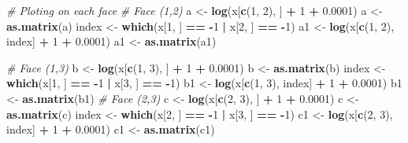 \documentclass[
]{article}
\newenvironment{Shaded}{\begin{snugshade}}{\end{snugshade}}
\newcommand{\CommentTok}[1]{\textcolor[rgb]{0.56,0.35,0.01}{\textit{#1}}}
\newcommand{\DecValTok}[1]{\textcolor[rgb]{0.00,0.00,0.81}{#1}}
\newcommand{\FloatTok}[1]{\textcolor[rgb]{0.00,0.00,0.81}{#1}}
\newcommand{\FunctionTok}[1]{\textcolor[rgb]{0.13,0.29,0.53}{\textbf{#1}}}
\newcommand{\NormalTok}[1]{#1}
\newcommand{\OtherTok}[1]{\textcolor[rgb]{0.56,0.35,0.01}{#1}}
\newcommand{\SpecialCharTok}[1]{\textcolor[rgb]{0.81,0.36,0.00}{\textbf{#1}}}
\begin{document}
\begin{Shaded}
\begin{Highlighting}[]
\CommentTok{\# Ploting on each face}
\CommentTok{\# Face (1,2)}
\NormalTok{a }\OtherTok{\textless{}{-}} \FunctionTok{log}\NormalTok{(x[}\FunctionTok{c}\NormalTok{(}\DecValTok{1}\NormalTok{, }\DecValTok{2}\NormalTok{), ] }\SpecialCharTok{+} \DecValTok{1} \SpecialCharTok{+} \FloatTok{0.0001}\NormalTok{)}
\NormalTok{a }\OtherTok{\textless{}{-}} \FunctionTok{as.matrix}\NormalTok{(a)}
\NormalTok{index }\OtherTok{\textless{}{-}} \FunctionTok{which}\NormalTok{(x[}\DecValTok{1}\NormalTok{, ] }\SpecialCharTok{==} \SpecialCharTok{{-}}\DecValTok{1} \SpecialCharTok{|}\NormalTok{ x[}\DecValTok{2}\NormalTok{, ] }\SpecialCharTok{==} \SpecialCharTok{{-}}\DecValTok{1}\NormalTok{)}
\NormalTok{a1 }\OtherTok{\textless{}{-}} \FunctionTok{log}\NormalTok{(x[}\FunctionTok{c}\NormalTok{(}\DecValTok{1}\NormalTok{, }\DecValTok{2}\NormalTok{), index] }\SpecialCharTok{+} \DecValTok{1} \SpecialCharTok{+} \FloatTok{0.0001}\NormalTok{)}
\NormalTok{a1 }\OtherTok{\textless{}{-}} \FunctionTok{as.matrix}\NormalTok{(a1)}

\CommentTok{\# Face (1,3)}
\NormalTok{b }\OtherTok{\textless{}{-}} \FunctionTok{log}\NormalTok{(x[}\FunctionTok{c}\NormalTok{(}\DecValTok{1}\NormalTok{, }\DecValTok{3}\NormalTok{), ] }\SpecialCharTok{+} \DecValTok{1} \SpecialCharTok{+} \FloatTok{0.0001}\NormalTok{)}
\NormalTok{b }\OtherTok{\textless{}{-}} \FunctionTok{as.matrix}\NormalTok{(b)}
\NormalTok{index }\OtherTok{\textless{}{-}} \FunctionTok{which}\NormalTok{(x[}\DecValTok{1}\NormalTok{, ] }\SpecialCharTok{==} \SpecialCharTok{{-}}\DecValTok{1} \SpecialCharTok{|}\NormalTok{ x[}\DecValTok{3}\NormalTok{, ] }\SpecialCharTok{==} \SpecialCharTok{{-}}\DecValTok{1}\NormalTok{)}
\NormalTok{b1 }\OtherTok{\textless{}{-}} \FunctionTok{log}\NormalTok{(x[}\FunctionTok{c}\NormalTok{(}\DecValTok{1}\NormalTok{, }\DecValTok{3}\NormalTok{), index] }\SpecialCharTok{+} \DecValTok{1} \SpecialCharTok{+} \FloatTok{0.0001}\NormalTok{)}
\NormalTok{b1 }\OtherTok{\textless{}{-}} \FunctionTok{as.matrix}\NormalTok{(b1)}
\CommentTok{\# Face (2,3)}
\NormalTok{c }\OtherTok{\textless{}{-}} \FunctionTok{log}\NormalTok{(x[}\FunctionTok{c}\NormalTok{(}\DecValTok{2}\NormalTok{, }\DecValTok{3}\NormalTok{), ] }\SpecialCharTok{+} \DecValTok{1} \SpecialCharTok{+} \FloatTok{0.0001}\NormalTok{)}
\NormalTok{c }\OtherTok{\textless{}{-}} \FunctionTok{as.matrix}\NormalTok{(c)}
\NormalTok{index }\OtherTok{\textless{}{-}} \FunctionTok{which}\NormalTok{(x[}\DecValTok{2}\NormalTok{, ] }\SpecialCharTok{==} \SpecialCharTok{{-}}\DecValTok{1} \SpecialCharTok{|}\NormalTok{ x[}\DecValTok{3}\NormalTok{, ] }\SpecialCharTok{==} \SpecialCharTok{{-}}\DecValTok{1}\NormalTok{)}
\NormalTok{c1 }\OtherTok{\textless{}{-}} \FunctionTok{log}\NormalTok{(x[}\FunctionTok{c}\NormalTok{(}\DecValTok{2}\NormalTok{, }\DecValTok{3}\NormalTok{), index] }\SpecialCharTok{+} \DecValTok{1} \SpecialCharTok{+} \FloatTok{0.0001}\NormalTok{)}
\NormalTok{c1 }\OtherTok{\textless{}{-}} \FunctionTok{as.matrix}\NormalTok{(c1)}


\end{Highlighting}
\end{Shaded}
\end{document}
